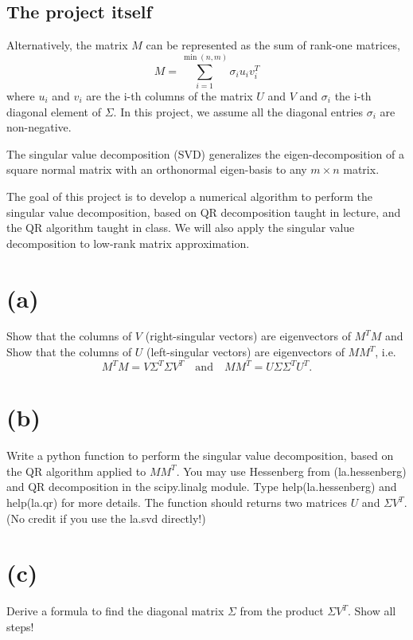 \documentclass[11.5pt]{article}
\theoremstyle{definition}
\begin{document}
\subsection{The project itself}
Alternatively, the matrix $M$ can be represented as the sum of rank-one matrices,
$$
M = \sum_{i=1}^{\min{(n,m)}} \sigma_i u_i v_i^{T}
$$
where $u_i$ and $v_i$ are the i-th columns of the matrix $U$ and $V$ and $\sigma_i$ the i-th diagonal element of $\Sigma$. In this project, we assume all the diagonal entries $\sigma_i$ are non-negative.


The singular value decomposition (SVD) generalizes the eigen-decomposition of a square normal matrix with an orthonormal eigen-basis to any $ m\times n $ matrix. 

The goal of this project is to develop a numerical algorithm to perform the singular value decomposition, based on QR decomposition taught in lecture, and the QR algorithm taught in class. We will also apply the singular value decomposition to low-rank matrix approximation.

\section*{(a)}  
Show that the columns of $V$ (right-singular vectors) are eigenvectors of $M^T M$ and 
Show that the columns of $U$ (left-singular vectors) are eigenvectors of $M M^T$, i.e. 
$$
M^T M = V \Sigma^T \Sigma V^T
\quad
\mbox{and}
\quad 
M M^T = U \Sigma \Sigma^T U^T.
$$ 

\section*{(b)}

Write a python function to perform the singular value decomposition, based on the QR algorithm applied to $M M^T$. You may use Hessenberg from (la.hessenberg) and QR decomposition in the scipy.linalg module. Type help(la.hessenberg) and help(la.qr) for more details. The function should returns two matrices $U$ and $\Sigma V^T$.
(No credit if you use the la.svd directly!) 

\section*{(c)}
Derive a formula to find the diagonal matrix $\Sigma$ from the product $\Sigma V^T$. Show all steps!
\end{document}
